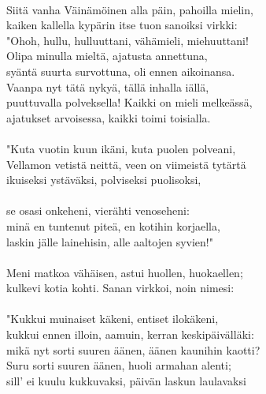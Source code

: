                                                          \\
Siitä vanha Väinämöinen alla päin, pahoilla mielin,      \\
kaiken kallella kypärin itse tuon sanoiksi virkki:       \\
"Ohoh, hullu, hulluuttani, vähämieli, miehuuttani!       \\
Olipa minulla mieltä, ajatusta annettuna,                \\
syäntä suurta survottuna, oli ennen aikoinansa.          \\
Vaanpa nyt tätä nykyä, tällä inhalla iällä,              \\
puuttuvalla polveksella! Kaikki on mieli melkeässä,      \\
ajatukset arvoisessa, kaikki toimi toisialla.            \\
                                                         \\
"Kuta vuotin kuun ikäni, kuta puolen polveani,           \\
Vellamon vetistä neittä, veen on viimeistä tytärtä       \\
ikuiseksi ystäväksi, polviseksi puolisoksi,              \\
                                                         \\
se osasi onkeheni, vierähti venoseheni:                  \\
minä en tuntenut piteä, en kotihin korjaella,            \\
laskin jälle lainehisin, alle aaltojen syvien!"          \\
                                                         \\
Meni matkoa vähäisen, astui huollen, huokaellen;         \\
kulkevi kotia kohti. Sanan virkkoi, noin nimesi:         \\
                                                         \\
"Kukkui muinaiset käkeni, entiset ilokäkeni,             \\
kukkui ennen illoin, aamuin, kerran keskipäivälläki:     \\
mikä nyt sorti suuren äänen, äänen kaunihin kaotti?      \\
Suru sorti suuren äänen, huoli armahan alenti;           \\
sill' ei kuulu kukkuvaksi, päivän laskun laulavaksi      \\
